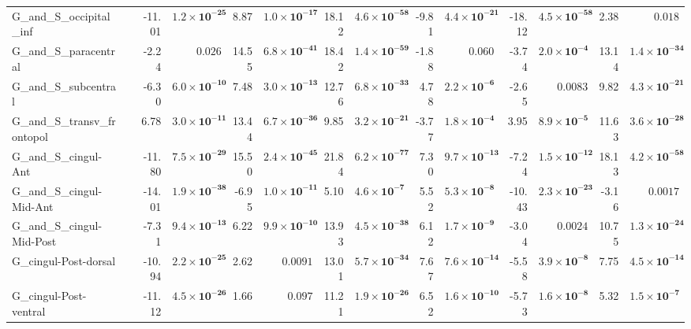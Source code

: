 {\begin{longtable}{llrrrrrrrrrrrr}
G\_and\_S\_occipital\_inf &  & -11.01 & $\mathbf{1.2{\times}10^{-25}}$ & 8.87 & $\mathbf{1.0{\times}10^{-17}}$ & 18.12 & $\mathbf{4.6{\times}10^{-58}}$ & -9.81 & $\mathbf{4.4{\times}10^{-21}}$ & -18.12 & $\mathbf{4.5{\times}10^{-58}}$ & 2.38 & $0.018$ \\
G\_and\_S\_paracentral &  & -2.24 & $0.026$ & 14.55 & $\mathbf{6.8{\times}10^{-41}}$ & 18.42 & $\mathbf{1.4{\times}10^{-59}}$ & -1.88 & $0.060$ & -3.74 & $\mathbf{2.0{\times}10^{-4}}$ & 13.14 & $\mathbf{1.4{\times}10^{-34}}$ \\
G\_and\_S\_subcentral &  & -6.30 & $\mathbf{6.0{\times}10^{-10}}$ & 7.48 & $\mathbf{3.0{\times}10^{-13}}$ & 12.76 & $\mathbf{6.8{\times}10^{-33}}$ & 4.78 & $\mathbf{2.2{\times}10^{-6}}$ & -2.65 & $0.0083$ & 9.82 & $\mathbf{4.3{\times}10^{-21}}$ \\
G\_and\_S\_transv\_frontopol &  & 6.78 & $\mathbf{3.0{\times}10^{-11}}$ & 13.44 & $\mathbf{6.7{\times}10^{-36}}$ & 9.85 & $\mathbf{3.2{\times}10^{-21}}$ & -3.77 & $\mathbf{1.8{\times}10^{-4}}$ & 3.95 & $\mathbf{8.9{\times}10^{-5}}$ & 11.63 & $\mathbf{3.6{\times}10^{-28}}$ \\
G\_and\_S\_cingul-Ant &  & -11.80 & $\mathbf{7.5{\times}10^{-29}}$ & 15.50 & $\mathbf{2.4{\times}10^{-45}}$ & 21.84 & $\mathbf{6.2{\times}10^{-77}}$ & 7.30 & $\mathbf{9.7{\times}10^{-13}}$ & -7.24 & $\mathbf{1.5{\times}10^{-12}}$ & 18.13 & $\mathbf{4.2{\times}10^{-58}}$ \\
G\_and\_S\_cingul-Mid-Ant &  & -14.01 & $\mathbf{1.9{\times}10^{-38}}$ & -6.95 & $\mathbf{1.0{\times}10^{-11}}$ & 5.10 & $\mathbf{4.6{\times}10^{-7}}$ & 5.52 & $\mathbf{5.3{\times}10^{-8}}$ & -10.43 & $\mathbf{2.3{\times}10^{-23}}$ & -3.16 & $0.0017$ \\
G\_and\_S\_cingul-Mid-Post &  & -7.31 & $\mathbf{9.4{\times}10^{-13}}$ & 6.22 & $\mathbf{9.9{\times}10^{-10}}$ & 13.93 & $\mathbf{4.5{\times}10^{-38}}$ & 6.12 & $\mathbf{1.7{\times}10^{-9}}$ & -3.04 & $0.0024$ & 10.75 & $\mathbf{1.3{\times}10^{-24}}$ \\
G\_cingul-Post-dorsal &  & -10.94 & $\mathbf{2.2{\times}10^{-25}}$ & 2.62 & $0.0091$ & 13.01 & $\mathbf{5.7{\times}10^{-34}}$ & 7.67 & $\mathbf{7.6{\times}10^{-14}}$ & -5.58 & $\mathbf{3.9{\times}10^{-8}}$ & 7.75 & $\mathbf{4.5{\times}10^{-14}}$ \\
G\_cingul-Post-ventral &  & -11.12 & $\mathbf{4.5{\times}10^{-26}}$ & 1.66 & $0.097$ & 11.21 & $\mathbf{1.9{\times}10^{-26}}$ & 6.52 & $\mathbf{1.6{\times}10^{-10}}$ & -5.73 & $\mathbf{1.6{\times}10^{-8}}$ & 5.32 & $\mathbf{1.5{\times}10^{-7}}$ \\

\end{longtable}}
